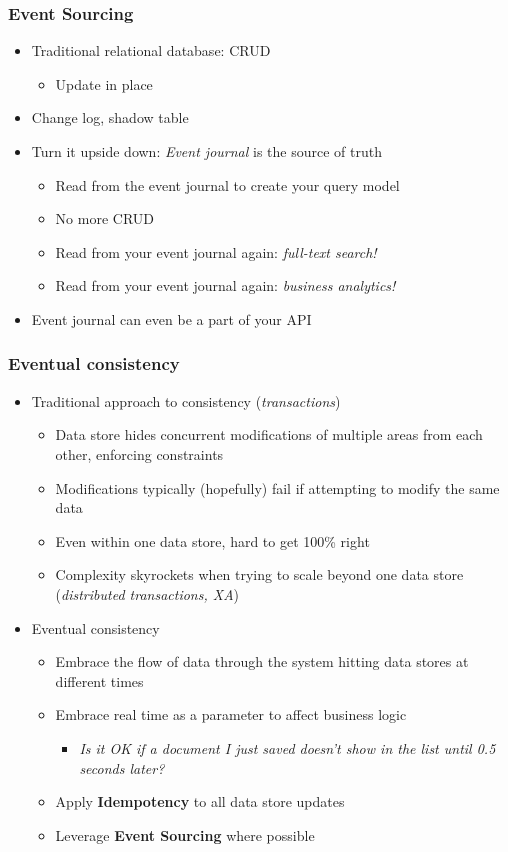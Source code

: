 \documentclass[8pt]{article}
\begin{document}
\subsubsection{Event Sourcing}
\label{sec:org4cf0297}
\begin{itemize}
\item Traditional relational database: CRUD
\begin{itemize}
\item Update in place
\end{itemize}
\item Change log, shadow table

\item Turn it upside down: \emph{Event journal} is the source of truth
\begin{itemize}
\item Read from the event journal to create your query model
\item No more CRUD
\item Read from your event journal again: \emph{full-text search!}
\item Read from your event journal again: \emph{business analytics!}
\end{itemize}

\item Event journal can even be a part of your API
\end{itemize}
\subsubsection{Eventual consistency}
\label{sec:org7f4b1bf}
\begin{itemize}
\item Traditional approach to consistency (\emph{transactions})
\begin{itemize}
\item Data store hides concurrent modifications of multiple areas from each other, enforcing constraints
\item Modifications typically (hopefully) fail if attempting to modify the same data
\item Even within one data store, hard to get 100\% right
\item Complexity skyrockets when trying to scale beyond one data store (\emph{distributed transactions, XA})
\end{itemize}

\item Eventual consistency
\begin{itemize}
\item Embrace the flow of data through the system hitting data stores at different times
\item Embrace real time as a parameter to affect business logic
\begin{itemize}
\item \emph{Is it OK if a document I just saved doesn't show in the list until 0.5 seconds later?}
\end{itemize}
\item Apply \textbf{Idempotency} to all data store updates
\item Leverage \textbf{Event Sourcing} where possible
\end{itemize}
\end{itemize}
\end{document}
